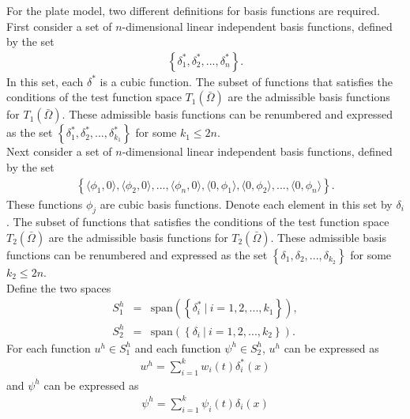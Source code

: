 \documentclass[../../main.tex]{subfiles}
\begin{document}
For the plate model, two different definitions for basis functions are required.\\

First consider a set of $n$-dimensional linear independent basis functions, defined by the set 
\begin{eqnarray*}
	\left\{\delta^*_1, \delta^*_2, ..., \delta^*_n\right\}.
\end{eqnarray*}
In this set, each $\delta^*$ is a cubic function. The subset of functions that satisfies the conditions of the test function space $T_1(\bar{\Omega})$ are the admissible basis functions for $T_1(\bar{\Omega})$. These admissible basis functions can be renumbered and expressed as the set $\left\{\delta^*_1, \delta^*_2, ..., \delta^*_{k_1}\right\}$ for some $k_1 \leq 2n$.\\

Next consider a set of $n$-dimensional linear independent basis functions, defined by the set
\begin{eqnarray*}
	\left\{\langle\phi_1, 0\rangle, \langle\phi_2, 0\rangle,...,\langle\phi_{n}, 0 \rangle,\langle 0,\phi_1\rangle,\langle 0 ,\phi_2\rangle,...,\langle 0,\phi_{n}\rangle \right\}.
\end{eqnarray*} These functions $\phi_j$ are cubic basis functions. Denote each element in this set by $\delta_i$. The subset of functions that satisfies the conditions of the test function space $T_2(\bar{\Omega})$ are the admissible basis functions for $T_2(\bar{\Omega})$. These admissible basis functions can be renumbered and expressed as the set $\left\{\delta_1, \delta_2, ..., \delta_{k_2}\right\}$ for some $k_2 \leq 2n$.\\


Define the two spaces
\begin{eqnarray*}
	S^h_1 & = & \textrm{span}\left(\left\{\delta^*_i \ | \ i = 1,2,...,k_1 \right\} \right),\\
	S^h_2 & = & \textrm{span}\left(\left\{\delta_i \ | \ i = 1,2,...,k_2 \right\} \right).
\end{eqnarray*}
For each function $u^h \in S_1^h$ and each function $\psi^h \in S_2^h$, $u^h$ can be expressed as
\begin{eqnarray*}
	w^h = \sum_{i = 1}^{k} w_i(t) \delta^*_{i}(x)
\end{eqnarray*} and $\psi^h$ can be expressed as
\begin{eqnarray*}
	\psi^h = \sum_{i = 1}^{k} \psi_i(t) \delta_{i}(x)
\end{eqnarray*}
\end{document}
